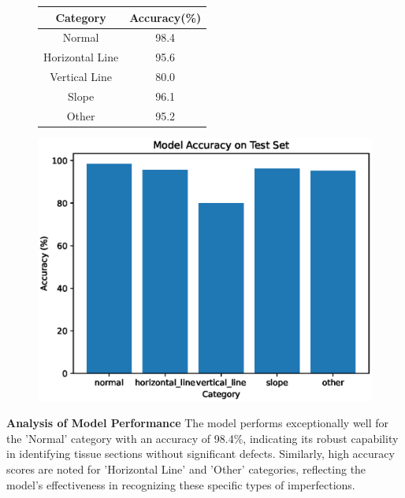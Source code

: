 \begin{figure}[H]
    \centering
    \begin{minipage}{0.45\textwidth}
        \centering
        \begin{tabular}{cc}
            \toprule
            Category & Accuracy(\%) \\
            \midrule
            Normal & 98.4 \\
            Horizontal Line & 95.6 \\
            Vertical Line & 80.0 \\
            Slope & 96.1 \\
            Other & 95.2 \\
            \bottomrule
        \end{tabular}
        \label{tab:model_accuracy}
    \end{minipage}
    \begin{minipage}{0.45\textwidth}
        \centering
        \includegraphics[width=\textwidth]{./fig/assistplot/accuracy.eps}
        \label{fig:accuracy_histogram}
    \end{minipage}
\end{figure}

\textbf{Analysis of Model Performance}
The model performs exceptionally well for the 'Normal' category with an accuracy of 98.4\%, indicating its robust capability in identifying tissue sections without significant defects. Similarly, high accuracy scores are noted for 'Horizontal Line' and 'Other' categories, reflecting the model’s effectiveness in recognizing these specific types of imperfections.

